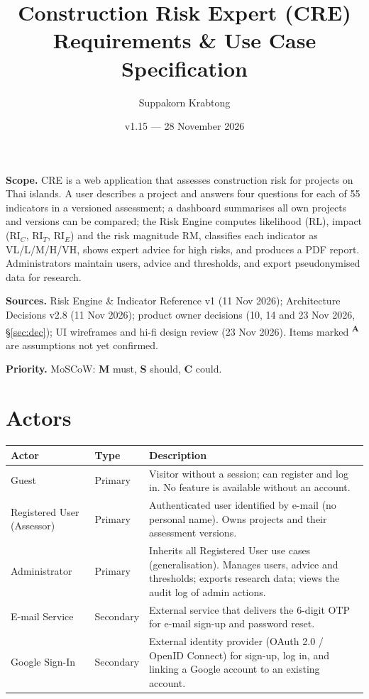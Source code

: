 \documentclass[11pt,a4paper]{article}
\title{\textcolor{creBlue}{\textbf{Construction Risk Expert (CRE)}}\\[2pt]\large Requirements \& Use Case Specification}
\author{Suppakorn Krabtong}
\date{v1.15 --- 28 November 2026}
\newcommand{\RL}{\mathrm{RL}}
\newcommand{\RIC}{\mathrm{RI}_{C}}
\newcommand{\RIT}{\mathrm{RI}_{T}}
\newcommand{\RIE}{\mathrm{RI}_{E}}
\newcommand{\RM}{\mathrm{RM}}
\newcommand{\assume}{\textsuperscript{\textcolor{orange!80!black}{\textbf{A}}}}
\begin{document}
\maketitle

\noindent\textbf{Scope.} CRE is a web application that assesses construction risk for projects on Thai islands. A user describes a project and answers four questions for each of 55 indicators in a versioned assessment; a dashboard summarises all own projects and versions can be compared; the Risk Engine computes likelihood ($\RL$), impact ($\RIC$, $\RIT$, $\RIE$) and the risk magnitude $\RM$, classifies each indicator as VL/L/M/H/VH, shows expert advice for high risks, and produces a PDF report. Administrators maintain users, advice and thresholds, and export pseudonymised data for research.

\noindent\textbf{Sources.} Risk Engine \& Indicator Reference v1 (11 Nov 2026); Architecture Decisions v2.8 (11 Nov 2026); product owner decisions (10, 14 and 23 Nov 2026, \S\ref{sec:dec}); UI wireframes and hi-fi design review (23 Nov 2026). Items marked \assume{} are assumptions not yet confirmed.

\noindent\textbf{Priority.} MoSCoW: \textbf{M} must, \textbf{S} should, \textbf{C} could.



\section{Actors}
\begin{tabularx}{\linewidth}{@{}l l Y@{}}
\toprule
{}Actor & Type & Description \\
\midrule
Guest & Primary & Visitor without a session; can register and log in. No feature is available without an account. \\
Registered User (Assessor) & Primary & Authenticated user identified by e-mail (no personal name). Owns projects and their assessment versions. \\
Administrator & Primary & Inherits all Registered User use cases (generalisation). Manages users, advice and thresholds; exports research data; views the audit log of admin actions. \\
E-mail Service & Secondary & External service that delivers the 6-digit OTP for e-mail sign-up and password reset. \\
Google Sign-In & Secondary & External identity provider (OAuth 2.0 / OpenID Connect) for sign-up, log in, and linking a Google account to an existing account. \\
\bottomrule
\end{tabularx}
\end{document}
